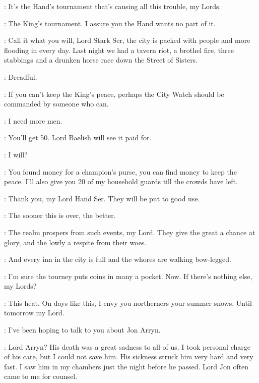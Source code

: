 
\JANOSSLYNT: It's the Hand's tournament that's causing all this trouble, my Lords. 

\NED: The King's tournament. I assure you the Hand wants no part of it. 

\JANOSSLYNT: Call it what you will, Lord Stark Ser, the city is packed with people and more flooding in every day. Last night we had a tavern riot, a brothel fire, three stabbings and a drunken horse race down the Street of Sisters. 

\VARYS: Dreadful. 

\RENLY: If you can't keep the King's peace, perhaps the City Watch should be commanded by someone who can. 

\JANOSSLYNT: I need more men. 

\NED: You'll get 50. Lord Baelish will see it paid for. 

\LITTLEFINGER: I will? 

\NED: You found money for a champion's purse, you can find money to keep the peace. I'll also give you 20 of my household guards till the crowds have left. 

\JANOSSLYNT: Thank you, my Lord Hand Ser. They will be put to good use. 


\NED: The sooner this is over, the better. 

\VARYS: The realm prospers from such events, my Lord. They give the great a chance at glory, and the lowly a respite from their woes. 

\LITTLEFINGER: And every inn in the city is full and the whores are walking bow-legged. 

\NED: I'm sure the tourney puts coins in many a pocket. Now. If there's nothing else, my Lords? 


\PYCELLE: This heat. On days like this, I envy you northerners your summer snows. Until tomorrow my Lord. 

\NED: I've been hoping to talk to you about Jon Arryn. 

\PYCELLE: Lord Arryn? His death was a great sadness to all of us. I took personal charge of his care, but I could not save him. His sickness struck him very hard and very fast. I saw him in my chambers just the night before he passed. Lord Jon often came to me for counsel. 

